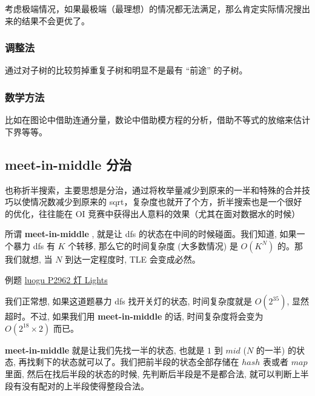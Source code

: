 考虑极端情况，如果最极端（最理想）的情况都无法满足，那么肯定实际情况搜出来的结果不会更优了。

\subsubsection{调整法}

通过对子树的比较剪掉重复子树和明显不是最有 “前途” 的子树。

\subsubsection{数学方法}

比如在图论中借助连通分量，数论中借助模方程的分析，借助不等式的放缩来估计下界等等。

\subsection{meet-in-middle 分治}

也称折半搜索，主要思想是分治，通过将枚举量减少到原来的一半和特殊的合并技巧以使情况数减少到原来的 sqrt，复杂度也就开了个方，折半搜索也是一个很好的优化，往往能在 OI 竞赛中获得出人意料的效果（尤其在面对数据水的时候）

所谓 \textbf{meet-in-middle} , 就是让 dfs 的状态在中间的时候碰面。我们知道, 如果一个暴力 dfs 有 $K$ 个转移, 那么它的时间复杂度 (大多数情况) 是 $O(K^N)$ 的。那我们就想, 当 $N$ 到达一定程度时, TLE 会变成必然。

例题 \href{https://www.luogu.org/problemnew/show/P2962}{luogu P2962  灯 Lights}

我们正常想, 如果这道题暴力 dfs 找开关灯的状态, 时间复杂度就是 $O(2^{35})$, 显然超时。不过, 如果我们用 \textbf{meet-in-middle} 的话, 时间复杂度将会变为 $O(2^{18} \times 2)$ 而已。

 \textbf{meet-in-middle} 就是让我们先找一半的状态, 也就是 $1$ 到 $mid$ ($N$ 的一半) 的状态, 再找剩下的状态就可以了。我们把前半段的状态全部存储在 $hash$ 表或者 $map$ 里面, 然后在找后半段的状态的时候, 先判断后半段是不是都合法, 就可以判断上半段有没有配对的上半段使得整段合法。
